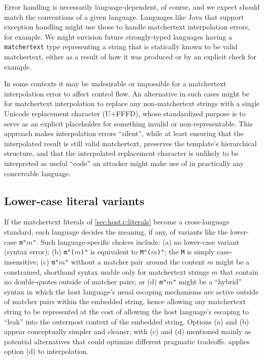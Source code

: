 Error handling is necessarily language-dependent, of course,
and we expect should match the conventions of a given language.
Languages like Java that support exception handling
might use those to handle matchertext interpolation errors,
for example.
We might envision future strongly-typed languages
having a \verb|matchertext| type representing a string
that is statically known to be valid matchertext,
either as a result of how it was produced
or by an explicit check for example.

In some contexts it may be undesirable or impossible
for a matchertext interpolation error to affect control flow.
An alternative in such cases might be for matchertext interpolation
to replace any non-matchertext strings with
a single Unicode replacement character (U+FFFD),
whose standardized purpose is to serve as an explicit placeholder
for something invalid or non-representable.
This approach makes interpolation errors ``silent'',
while at least ensuring that the interpolated result
is still valid matchertext,
preserves the template's hierarchical structure,
and that the interpolated replacement character
is unlikely to be interpreted as useful ``code''
an attacker might make use of in practically any conceivable language.


\subsection{Lower-case literal variants}
\label{app:interp:lower}

If the matchertext literals of \cref{sec:host:c:literals}
become a cross-language standard,
each language decides the meaning, if any,
of variants like the lower-case \verb|m"|$m$\verb|"|.
Such language-specific choices include:
(a) no lower-case variant (syntax error);
(b) \verb|m"(|$m$\verb|)"| is equivalent to \verb|M"(|$m$\verb|)"|;
\ie the \verb|M| is simply case-insensitive;
(c) \verb|m"|$m$\verb|"| without a matcher pair around the content $m$
might be a constrained, shorthand syntax
usable only for matchertext strings $m$ that contain no double-quotes
outside of matcher pairs; or
(d) \verb|m"|$m$\verb|"| might be a ``hybrid'' syntax
in which the host language's usual escaping mechanisms are active
outside of matcher pairs within the embedded string,
hence allowing any matchertext string to be represented
at the cost of allowing the host language's escaping to ``leak''
into the outermost context of the embedded string.
Options (a) and (b) appear conceptually simpler and cleaner,
with (c) and (d) mentioned mainly as potential alternatives
that could optimize different pragmatic tradeoffs.
 applies option (d) to interpolation.


